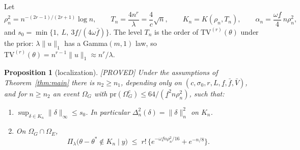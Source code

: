 \documentclass[11pt]{article}
\newtheorem{proposition}{Proposition}
\theoremstyle{definition}
\theoremstyle{remark}
\newcommand{\pr}{\mathrm{pr}}
\newcommand{\TV}{\mathrm{TV}}
\newcommand{\thetas}{\theta^{*}}
\newcommand{\om}{\omega}
\newcommand{\fl}{\underline f}
\newcommand{\fu}{\bar f}
\newcommand{\Vb}{\bar V}
\newcommand{\nn}[1]{\|#1\|_n}
\newcommand{\proved}{\textup{[PROVED]}}
\begin{document}
Let
\begin{equation}\label{eq:Kn}
\rho_n^2=n^{-(2r-1)/(2r+1)}\log n,\qquad T_n=\frac{4n^{r}}{\lambda}=\frac4c\sqrt n,\qquad K_n=K(\rho_n,T_n),\qquad \alpha_n=\frac{\om\fl}{4}\,n\rho_n^2 ,
\end{equation}
and $s_0=\min\{1,\ L,\ 3\fl/(4\om\fu)\}$. The level $T_n$ is the order of $\TV^{(r)}(\theta)$ under the prior: $\lambda\|u\|_1$ has a Gamma$(m,1)$ law, so $\TV^{(r)}(\theta)=n^{r-1}\|u\|_1\approx n^{r}/\lambda$.

\begin{proposition}[localization]\label{prop:local}\proved{}
Under the assumptions of Theorem~\ref{thm:main} there is $n_2\ge n_1$, depending only on $(c,\sigma_0,r,L,\fl,\fu,\Vb)$, and for $n\ge n_2$ an event $\Omega_G$ with $\pr(\Omega_G^c)\le64/(\fl^2n\rho_n^2)$, such that:
\begin{enumerate}[label=(\alph*),itemsep=1pt,topsep=2pt]
\item $\sup_{\delta\in K_n}\|\delta\|_\infty\le s_0$. In particular $\Delta_n^2(\delta)=\nn{\delta}^2$ on $K_n$.
\item On $\Omega_G\cap\Omega_E$,
\[
\Pi_\lambda\bigl(\theta-\thetas\notin K_n\mid y\bigr)\;\le\;r!\,\bigl\{e^{-\om\fl n\rho_n^2/16}+e^{-n/8}\bigr\}.
\]
\end{enumerate}
\end{proposition}
\end{document}
